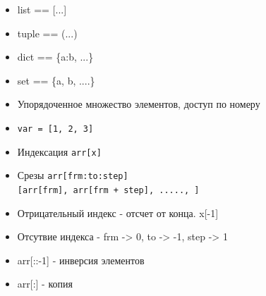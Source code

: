 \documentclass{article}
\begin{document}
\LARGE

\begin{itemize}
	\item list == [...]
	\item tuple == (...)
	\item dict == \{a:b, ...\}
	\item set == \{a, b, ....\}
\end{itemize}
\newpage

\begin{itemize}
	\item Упорядоченное множество элементов, доступ по номеру
	\item \lstinline!var = [1, 2, 3]!
	\item Индексация \lstinline!arr[x]!
	\item Срезы 
			\lstinline!arr[frm:to:step]! \\
			\lstinline![arr[frm], arr[frm + step], ....., ]!
	\item Отрицательный индекс - отсчет от конца. x[-1]
	\item Отсутвие индекса - frm -> 0, to -> -1, step -> 1
	\item arr[::-1] - инверсия элементов
	\item arr[:] - копия
\end{itemize}
\newpage
\end{document}
